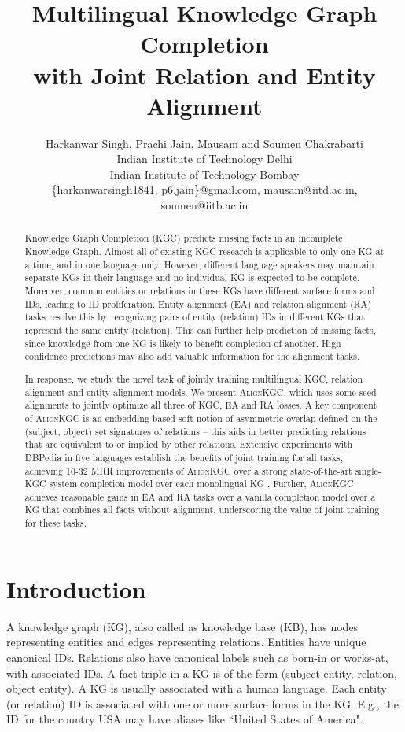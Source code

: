 \documentclass[11pt]{article}
\title{Multilingual Knowledge Graph Completion
\\with Joint Relation and Entity Alignment}
\author{
Harkanwar Singh, 
{Prachi Jain}, 
Mausam {\normalfont and} 
Soumen Chakrabarti
\\ 
 Indian Institute of Technology Delhi \\
 Indian Institute of Technology Bombay  \\
\{harkanwarsingh1841, p6.jain\}@gmail.com,
mausam@iitd.ac.in,
soumen@iitb.ac.in
}
\def\shortname{\textsc{Align\-KGC}}
\begin{document}
\maketitle

\begin{abstract}
Knowledge Graph Completion (KGC) predicts missing facts in an incomplete Knowledge Graph. Almost all of existing KGC research is applicable to only one KG at a time, and in one language only. However, different language speakers may maintain separate KGs in their language and no individual KG is expected to be complete.  Moreover, common entities or relations in these KGs have different surface forms and IDs, leading to ID proliferation. Entity alignment (EA) and relation alignment (RA) tasks resolve this by recognizing pairs of entity (relation) IDs in different KGs that represent the same entity (relation). This can further help prediction of missing facts, since knowledge from one KG is likely to benefit completion of another. High confidence predictions may also add valuable information for the alignment tasks.

In response, we study the novel task of jointly training multilingual KGC, relation alignment and entity alignment models. We present \shortname, which uses some seed alignments to jointly optimize all three of KGC, EA and RA losses. A key component of \shortname{} is an embedding-based soft notion of asymmetric overlap defined on the (subject, object) set signatures of relations -- this aids in better predicting relations that are equivalent to or implied by other relations.  Extensive experiments with DBPedia in five languages establish the benefits of joint training for all tasks, achieving 10-32 MRR improvements of \shortname{} over a strong state-of-the-art single-KGC system completion model over each monolingual KG . Further, \shortname{} achieves reasonable gains in EA and RA tasks over a vanilla completion model over a KG that combines all facts without alignment, underscoring the value of joint training for these tasks.
     


\end{abstract}


\section{Introduction}
\label{sec:Intro}

A knowledge graph (KG), also called as knowledge base (KB), has nodes representing entities and edges representing relations.  Entities have unique canonical IDs.  Relations also have canonical labels such as born-in or works-at, with associated IDs.  A fact triple in a KG is of the form (subject entity, relation, object entity).  A KG is usually associated with a human language.
Each entity (or relation) ID is associated with one or more surface forms in the KG. E.g., the ID for the country USA may have aliases like ``United States of America". 
\end{document}
